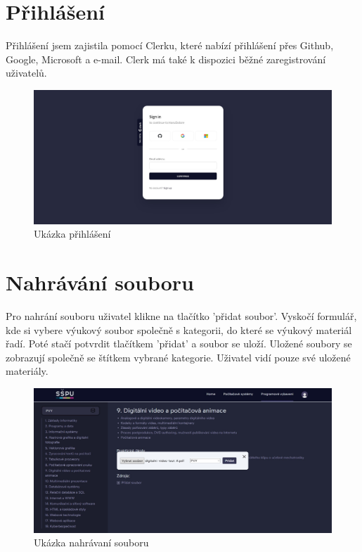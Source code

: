 \documentclass[12pt, a4paper,
oneside,      %
openright
]{report}
\begin{document}
\section{Přihlášení}
Přihlášení jsem zajistila pomocí Clerku, které nabízí přihlášení přes Github, Google, Microsoft a e-mail. Clerk má také k dispozici běžné zaregistrování uživatelů.
\begin{figure}[h]
	\centering
	\includegraphics[width=1\linewidth]{image/sign-in.jpg}
	\caption{Ukázka přihlášení}
\end{figure}

\section{Nahrávání souboru}
Pro nahrání souboru uživatel klikne na tlačítko 'přidat soubor'. Vyskočí formulář, kde si vybere výukový soubor společně s kategorii, do které se výukový materiál řadí. Poté stačí potvrdit tlačítkem 'přidat' a soubor se uloží. Uložené soubory se zobrazují společně se štítkem vybrané kategorie. Uživatel vidí pouze své uložené materiály.

\newpage
\begin{figure}[h]
	\centering
	\includegraphics[width=1\linewidth]{image/upload.jpg} 
	\caption{Ukázka nahrávaní souboru}
\end{figure}
\end{document}

